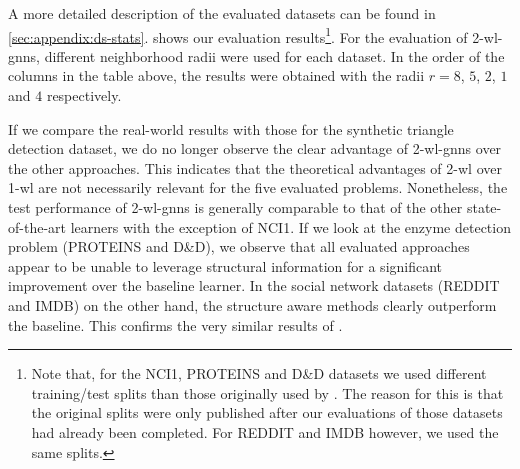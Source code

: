 A more detailed description of the evaluated datasets can be found in \cref{sec:appendix:ds-stats}.
 shows our evaluation results\footnote{
	Note that, for the NCI1, PROTEINS and D\&D datasets we used different training/test splits than those originally used by \citet{Errica2020}.
	The reason for this is that the original splits were only published after our evaluations of those datasets had already been completed.
	For REDDIT and IMDB however, we used the same splits.
}.
For the evaluation of 2-\acs{wl}-\acsp{gnn}, different neighborhood radii were used for each dataset.
In the order of the columns in the table above, the results were obtained with the radii $r = 8$, $5$, $2$, $1$ and $4$ respectively.

If we compare the real-world results with those for the synthetic triangle detection dataset, we do no longer observe the clear advantage of 2-\acs{wl}-\acsp{gnn} over the other approaches.
This indicates that the theoretical advantages of 2-\acs{wl} over 1-\acs{wl} are not necessarily relevant for the five evaluated problems.
Nonetheless, the test performance of 2-\acs{wl}-\acsp{gnn} is generally comparable to that of the other state-of-the-art learners with the exception of NCI1.
If we look at the enzyme detection problem (PROTEINS and D\&D), we observe that all evaluated approaches appear to be unable to leverage structural information for a significant improvement over the baseline learner.
In the social network datasets (REDDIT and IMDB) on the other hand, the structure aware methods clearly outperform the baseline.
This confirms the very similar results of \citet{Errica2020}.
